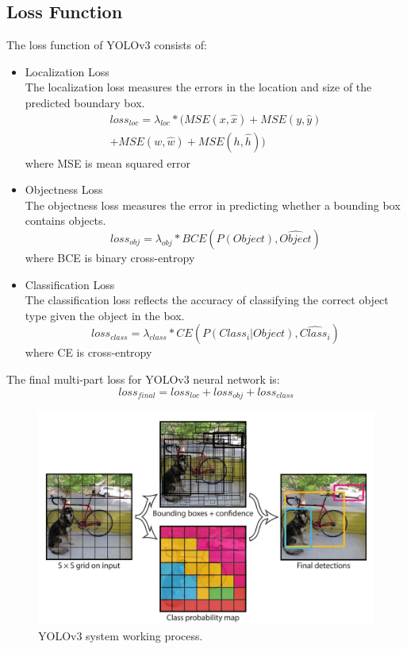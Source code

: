 \documentclass[letterpaper]{article} %
\begin{document}
\subsection{Loss Function}
The loss function of YOLOv3 consists of:
\begin{itemize}
    \item Localization Loss\\
    The localization loss measures the errors in the location and size of the predicted boundary box.
\begin{equation}
\begin{aligned}
loss_{loc} = \lambda_{loc}*(MSE(x, \hat{x})+MSE(y, \hat{y})\\+MSE(w, \hat{w})+MSE(h, \hat{h}))
\end{aligned}
\end{equation}
\scriptsize
where MSE is mean squared error
\normalsize
 \item Objectness Loss\\
    The objectness loss measures the error in predicting whether a bounding box contains objects.
    \begin{equation}
   loss_{obj} = \lambda_{obj}*BCE(P(Object), \hat{Object})
   \end{equation}
   \scriptsize
where BCE is binary cross-entropy
\normalsize

    \item Classification Loss\\
    The classification loss reflects the accuracy of classifying the correct object type given the object in the box.
    \begin{equation}
    loss_{class} = \lambda_{class}*CE(P(Class_{i}|Object), \hat{Class_i})
    \end{equation}
    \scriptsize
where CE is cross-entropy
\normalsize
\end{itemize}
The final multi-part loss for YOLOv3 neural network is:
\begin{equation}
loss_{final} = loss_{loc} + loss_{obj} + loss_{class}
\end{equation}


\begin{figure}[ht]
\hspace{-10mm}
\centering
\includegraphics[width=0.85\linewidth,height = 0.5\linewidth]{Figure/yolo_grid.JPG}
\caption{\footnotesize{YOLOv3 system working process.}}
\label{fig:grid}
\vspace{-2mm}
\end{figure}
\end{document}
